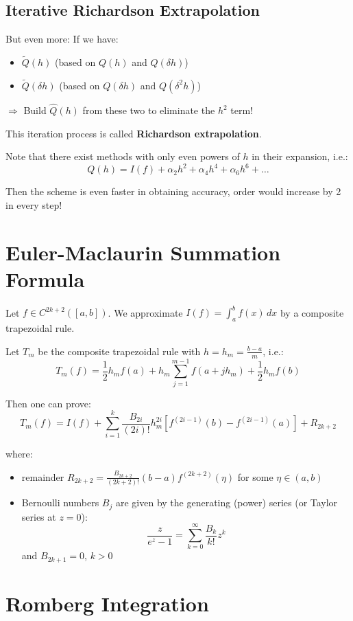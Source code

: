 \subsection{Iterative Richardson Extrapolation}

But even more: If we have:
\begin{itemize}
    \item $\tilde{Q}(h)$ (based on $Q(h)$ and $Q(\delta h)$)
    \item $\tilde{Q}(\delta h)$ (based on $Q(\delta h)$ and $Q(\delta^2 h)$)
\end{itemize}

$\Rightarrow$ Build $\hat{Q}(h)$ from these two to eliminate the $h^2$ term!

This iteration process is called \textbf{Richardson extrapolation}.

Note that there exist methods with only even powers of $h$ in their expansion, i.e.:
\[Q(h) = I(f) + \alpha_2 h^2 + \alpha_4 h^4 + \alpha_6 h^6 + \ldots\]

Then the scheme is even faster in obtaining accuracy, order would increase by 2 in every step!

\section{Euler-Maclaurin Summation Formula}

Let $f \in C^{2k+2}([a,b])$. We approximate $I(f) = \int_a^b f(x) \, dx$ by a composite trapezoidal rule.

Let $T_m$ be the composite trapezoidal rule with $h = h_m = \frac{b-a}{m}$, i.e.:
\[T_m(f) = \frac{1}{2} h_m f(a) + h_m \sum_{j=1}^{m-1} f(a + jh_m) + \frac{1}{2} h_m f(b)\]

Then one can prove:
\[T_m(f) = I(f) + \sum_{i=1}^k \frac{B_{2i}}{(2i)!} h_m^{2i} [f^{(2i-1)}(b) - f^{(2i-1)}(a)] + R_{2k+2}\]

where:
\begin{itemize}
    \item remainder $R_{2k+2} = \frac{B_{2k+2}}{(2k+2)!} (b-a) f^{(2k+2)}(\eta)$ for some $\eta \in (a,b)$
    \item Bernoulli numbers $B_j$ are given by the generating (power) series (or Taylor series at $z = 0$):
    \[\frac{z}{e^z - 1} = \sum_{k=0}^{\infty} \frac{B_k}{k!} z^k\]
    and $B_{2k+1} = 0$, $k > 0$
\end{itemize}

\section{Romberg Integration}

